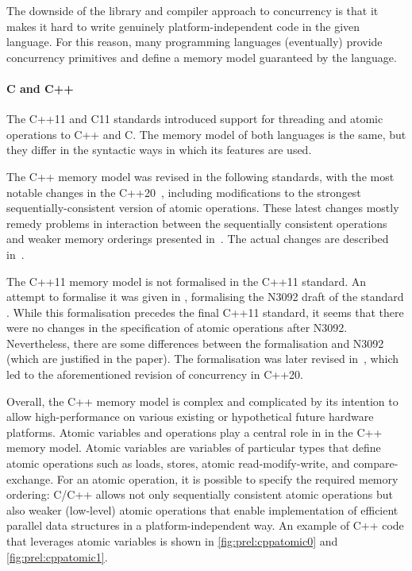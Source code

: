 The downside of the library and compiler approach to concurrency is that it
makes it hard to write genuinely platform-independent code in the given language.
For this reason, many programming languages (eventually) provide concurrency
primitives and define a memory model guaranteed by the language.

\paragraph{C and C++}
%
The C++11  and C11  standards
introduced support for threading and atomic operations to C++ and C.
The memory model of both languages is the same, but they differ in the
syntactic ways in which its features are used.

The C++ memory model was revised in the following standards, with the most
notable changes in the C++20~, including modifications to the strongest sequentially-consistent version of atomic operations.
These latest changes mostly remedy problems in interaction between the
sequentially consistent operations and weaker memory orderings presented
in~.
The actual changes are described in~.

The C++11 memory model is not formalised in the C++11 standard.
An attempt to formalise it was given in , formalising the
N3092 draft of the standard \cite{N3092}.
While this formalisation precedes the final C++11 standard, it seems that there were no changes in the specification of atomic operations after N3092.
Nevertheless, there are some differences between the formalisation and N3092
(which are justified in the paper).
The formalisation was later revised in~, which led to the aforementioned revision of concurrency in C++20.

Overall, the C++ memory model is complex and complicated by its intention to
allow high-performance on various existing or hypothetical future hardware
platforms.
Atomic variables and operations play a central role in in the C++ memory model.
Atomic variables are variables of particular types that define atomic operations
such as loads, stores, atomic read-modify-write, and compare-exchange.
For an atomic operation, it is possible to specify the required memory
ordering: C/C++ allows not only sequentially consistent atomic operations but
also weaker (low-level) atomic operations that enable implementation of
efficient parallel data structures in a platform-independent way.
An example of C++ code that leverages atomic variables is shown in \autoref{fig:prel:cppatomic0} and \autoref{fig:prel:cppatomic1}.

